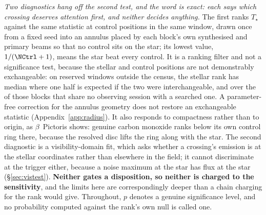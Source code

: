 \emph{Two diagnostics hang off the second test, and the word is exact: each
says which crossing deserves attention first, and neither decides anything.}
The first ranks $T_\star$ against the same statistic at \NCtrl{} control
positions in the same window, drawn once from a fixed seed into an annulus
placed by each block's own synthesised and primary beams so that no control
sits on the star; its lowest value, $1/(\NCtrl+1)$, means the star beat every
control. It is a ranking filter and not a significance test, because the
stellar and control positions are not demonstrably exchangeable: on
\HoWin{} reserved windows outside the census, the stellar
rank has median \HoRankMed{} where one half is expected if the two were
interchangeable, and \HsIndRankMed{} over the \HsIndBlocks{} of those blocks
that share no observing session with a searched one. A parameter-free
correction for the annulus geometry does not restore an exchangeable
statistic (Appendix~\ref{app:radius}). It
also responds to compactness rather than to origin, as $\beta$~Pictoris
shows: genuine carbon monoxide ranks below its own control ring there,
because the resolved disc lifts the ring along with the star. The second
diagnostic is a visibility-domain fit, which asks whether a crossing's
emission is at the stellar coordinates rather than elsewhere in the field; it
cannot discriminate at the trigger either, because a noise maximum at the
star has flux at the star (\S\ref{sec:vistest}). \textbf{Neither gates a
disposition, so neither is charged to the sensitivity}, and the limits here
are correspondingly deeper than a chain charging for the rank would give.
Throughout, $p$ denotes a genuine significance level, and no probability
computed against the rank's own null is called one.

